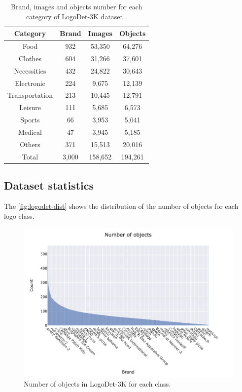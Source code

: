 \begin{table}
    \centering
    \begin{tabular}{c | c  c  c } 
     \hline
     \textbf{Category} & \textbf{Brand} & \textbf{Images} & \textbf{Objects} \\
     \hline
    Food & 932 & 53,350 & 64,276 \\ 
    Clothes & 604 & 31,266 & 37,601 \\ 
    Necessities & 432 & 24,822 & 30,643 \\ 
    Electronic & 224 & 9,675 & 12,139 \\ 
    Transportation & 213 & 10,445 & 12,791 \\ 
    Leisure & 111 & 5,685 & 6,573 \\ 
    Sports & 66 & 3,953 & 5,041 \\ 
    Medical & 47 & 3,945 & 5,185 \\ 
    Others & 371 & 15,513 & 20,016 \\ 
    \hline
    Total & 3,000 & 158,652 & 194,261 \\ 

    \end{tabular}
    \caption{Brand, images and objects number for each category of LogoDet-3K dataset \cite{wang2022logodet}.}
    \label{table:logodet3k-category-statistics}
\end{table}

\subsection{Dataset statistics}
The \autoref{fig:logodet-dist} shows the distribution of the number of objects for each logo class.
\begin{figure}[ht]
	\centering

    \begin{center}
        \includegraphics[width=\columnwidth]{images/freq.jpeg}
    \end{center}
	\caption{Number of objects in LogoDet-3K for each class.}%
	\label{fig:logodet-dist}%
\end{figure}


